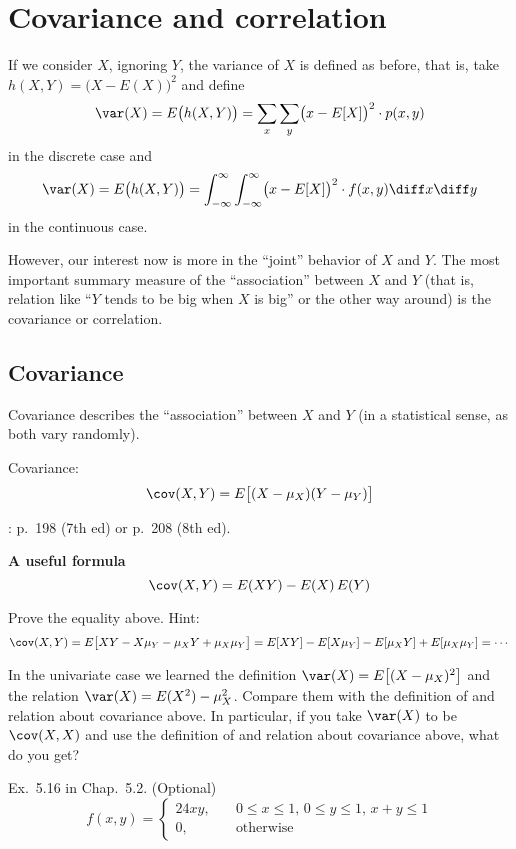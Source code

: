 \documentclass[12pt]{article}
\begin{document}
\section{Covariance and correlation}

If we consider $X$, ignoring $Y$,
the variance of $X$ is defined as before, that is,
take $h(X, Y) = \bigl(X - E(X)\bigr)^2$ and define
\[
\var(X)
= E\bigl(h(X, Y)\bigr)
= \sum_{x}\sum_{y} \bigl(x - E[X]\bigr)^2 \cdot p(x,y)
\]
in the discrete case and
\[
\var(X)
= E\bigl(h(X, Y)\bigr)
= \int_{-\infty}^{\infty} \int_{-\infty}^{\infty}
    \bigl(x - E[X]\bigr)^2 \cdot f(x,y) \diff x\diff y
\]
in the continuous case.

However, our interest now is more in the ``joint'' behavior of $X$ and
$Y$.
The most important summary measure of the ``association'' between $X$
and $Y$
(that is, relation like ``$Y$ tends to be big when $X$ is big''
or the other way around)
is the covariance or correlation.

\subsection{Covariance}

Covariance describes the ``association'' between
$X$ and $Y$ (in a statistical sense, as both vary randomly).

\alert[Definition]%
Covariance:
\[
\cov(X,Y) = E\bigl[(X - \mu_X)(Y - \mu_Y)\bigr]
\]

: p.~198 (7th ed) or p.~208 (8th ed).

\textbf{A useful formula}
\[
\cov(X,Y) = E(XY) - E(X)\,E(Y)
\]

\exercise
Prove the equality above.
Hint:
\[
\cov(X,Y)
= E\bigl[XY - X\mu_Y - \mu_X Y + \mu_X\mu_Y\bigr]
= E[XY] - E[X\mu_Y] - E[\mu_X Y] + E[\mu_X\mu_Y]
= \dotsb
\]

\alert[Remark]%
In the univariate case we learned the definition
$\var(X) = E\bigl[(X - \mu_X)^2\bigr]$ and the relation
$\var(X) = E(X^2) - \mu_X^2$.
Compare them with the definition of and relation about
covariance above.
In particular, if you take
$\var(X)$ to be $\cov(X, X)$ and use the definition of and relation
about covariance above, what do you get?


\example
Ex.~5.16 in Chap.~5.2. (Optional)
\[
f(x,y) = \begin{cases}
        24xy,\quad  & 0\le x \le 1,\, 0\le y \le 1,\, x + y \le 1 \\
        0,          & \text{otherwise}
    \end{cases}
\]
\end{document}

